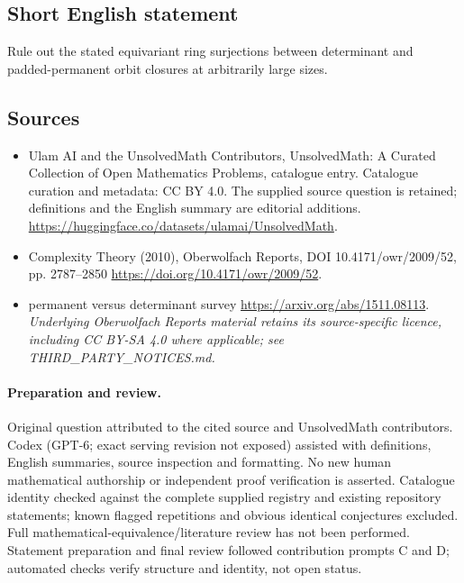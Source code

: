 \documentclass[11pt]{article}
\begin{document}
\subsection{Short English statement}
Rule out the stated equivariant ring surjections between determinant and padded-permanent orbit closures at arbitrarily large sizes.
\subsection{Sources}
\begin{itemize}
\item[\hypertarget{source:statement:1}{S1}] Ulam AI and the UnsolvedMath Contributors, UnsolvedMath: A Curated Collection of Open Mathematics Problems, catalogue entry. Catalogue curation and metadata: CC BY 4.0. The supplied source question is retained; definitions and the English summary are editorial additions.
\url{https://huggingface.co/datasets/ulamai/UnsolvedMath}.
\item[\hypertarget{source:statement:2}{S2}] Complexity Theory (2010), Oberwolfach Reports, DOI 10.4171/owr/2009/52, pp. 2787--2850
\url{https://doi.org/10.4171/owr/2009/52}.
\item[\hypertarget{source:statement:3}{S3}] permanent versus determinant survey
\url{https://arxiv.org/abs/1511.08113}.
\textit{Underlying Oberwolfach Reports material retains its source-specific licence, including CC BY-SA 4.0 where applicable; see THIRD\_PARTY\_NOTICES.md.}
\end{itemize}
\paragraph{Preparation and review.}
Original question attributed to the cited source and UnsolvedMath contributors. Codex (GPT-6; exact serving revision not exposed) assisted with definitions, English summaries, source inspection and formatting. No new human mathematical authorship or independent proof verification is asserted. Catalogue identity checked against the complete supplied registry and existing repository statements; known flagged repetitions and obvious identical conjectures excluded. Full mathematical-equivalence/literature review has not been performed. Statement preparation and final review followed contribution prompts C and D; automated checks verify structure and identity, not open status.
\label{end:statement}
\end{document}
